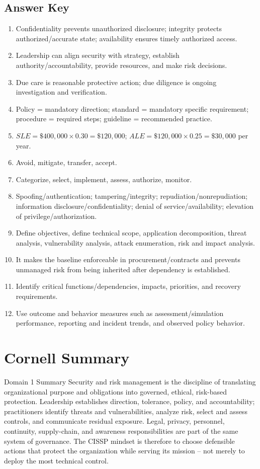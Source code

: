 \documentclass[10pt,letterpaper]{article}
\begin{document}
\subsection*{\color{teal}Answer Key}
\begin{enumerate}
\item Confidentiality prevents unauthorized disclosure; integrity protects authorized/accurate state; availability ensures timely authorized access.
\item Leadership can align security with strategy, establish authority/accountability, provide resources, and make risk decisions.
\item Due care is reasonable protective action; due diligence is ongoing investigation and verification.
\item Policy = mandatory direction; standard = mandatory specific requirement; procedure = required steps; guideline = recommended practice.
\item \(SLE=\$400{,}000\times0.30=\$120{,}000\); \(ALE=\$120{,}000\times0.25=\$30{,}000\) per year.
\item Avoid, mitigate, transfer, accept.
\item Categorize, select, implement, assess, authorize, monitor.
\item Spoofing/authentication; tampering/integrity; repudiation/nonrepudiation; information disclosure/confidentiality; denial of service/availability; elevation of privilege/authorization.
\item Define objectives, define technical scope, application decomposition, threat analysis, vulnerability analysis, attack enumeration, risk and impact analysis.
\item It makes the baseline enforceable in procurement/contracts and prevents unmanaged risk from being inherited after dependency is established.
\item Identify critical functions/dependencies, impacts, priorities, and recovery requirements.
\item Use outcome and behavior measures such as assessment/simulation performance, reporting and incident trends, and observed policy behavior.
\end{enumerate}

\section{\color{navy}Cornell Summary}
\begin{summarybox}{Domain 1 Summary}
Security and risk management is the discipline of translating organizational purpose and obligations into governed, ethical, risk-based protection. Leadership establishes direction, tolerance, policy, and accountability; practitioners identify threats and vulnerabilities, analyze risk, select and assess controls, and communicate residual exposure. Legal, privacy, personnel, continuity, supply-chain, and awareness responsibilities are part of the same system of governance. The CISSP mindset is therefore to choose defensible actions that protect the organization while serving its mission -- not merely to deploy the most technical control.
\end{summarybox}
\end{document}
